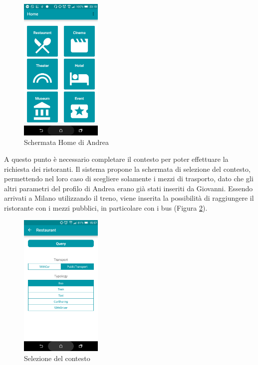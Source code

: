 \begin{figure}[H]
	\centering
	\includegraphics[width=0.35\textwidth]{4-progettazione-alto-livello/Immagini/home_caso_d'uso.png}
	\caption{Schermata Home di Andrea}\label{fig:usecase-home}
\end{figure}

A questo punto è necessario completare il contesto per poter effettuare la richiesta dei ristoranti. Il sistema propone la schermata di selezione del contesto, permettendo nel loro caso di scegliere solamente i mezzi di trasporto, dato che gli altri parametri del profilo di Andrea erano già stati inseriti da Giovanni. Essendo arrivati a Milano utilizzando il treno, viene inserita la possibilità di raggiungere il ristorante con i mezzi pubblici, in particolare con i bus (Figura \ref{fig:usecase-contesto}). 

\begin{figure}[H]
	\centering
	\includegraphics[width=0.35\textwidth]{4-progettazione-alto-livello/Immagini/contesto_caso_d'uso.png}
	\caption{Selezione del contesto}\label{fig:usecase-contesto}
\end{figure}

